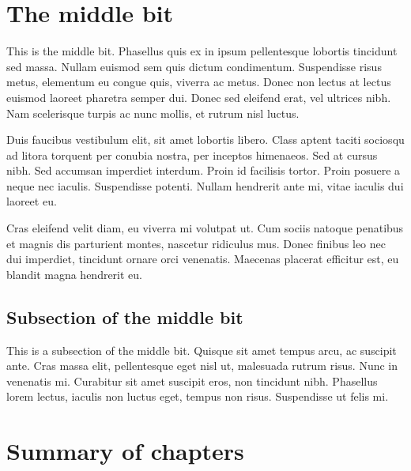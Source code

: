 \documentclass[12pt,a4paper,]{report}
\begin{document}
\hypertarget{the-middle-bit}{%
\section{The middle bit}\label{the-middle-bit}}

This is the middle bit. Phasellus quis ex in ipsum pellentesque lobortis
tincidunt sed massa. Nullam euismod sem quis dictum condimentum.
Suspendisse risus metus, elementum eu congue quis, viverra ac metus.
Donec non lectus at lectus euismod laoreet pharetra semper dui. Donec
sed eleifend erat, vel ultrices nibh. Nam scelerisque turpis ac nunc
mollis, et rutrum nisl luctus.

Duis faucibus vestibulum elit, sit amet lobortis libero. Class aptent
taciti sociosqu ad litora torquent per conubia nostra, per inceptos
himenaeos. Sed at cursus nibh. Sed accumsan imperdiet interdum. Proin id
facilisis tortor. Proin posuere a neque nec iaculis. Suspendisse
potenti. Nullam hendrerit ante mi, vitae iaculis dui laoreet eu.

Cras eleifend velit diam, eu viverra mi volutpat ut. Cum sociis natoque
penatibus et magnis dis parturient montes, nascetur ridiculus mus. Donec
finibus leo nec dui imperdiet, tincidunt ornare orci venenatis. Maecenas
placerat efficitur est, eu blandit magna hendrerit eu.

\hypertarget{subsection-of-the-middle-bit}{%
\subsection{Subsection of the middle
bit}\label{subsection-of-the-middle-bit}}

This is a subsection of the middle bit. Quisque sit amet tempus arcu, ac
suscipit ante. Cras massa elit, pellentesque eget nisl ut, malesuada
rutrum risus. Nunc in venenatis mi. Curabitur sit amet suscipit eros,
non tincidunt nibh. Phasellus lorem lectus, iaculis non luctus eget,
tempus non risus. Suspendisse ut felis mi.

\hypertarget{summary-of-chapters}{%
\section{Summary of chapters}\label{summary-of-chapters}}
\end{document}
